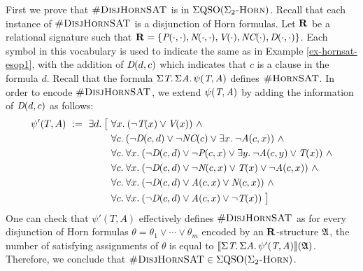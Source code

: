 First we prove that $\textsc{\#DisjHornSAT}$ is in $\Sigma{\rm QSO}(\Sigma_2\textsc{-Horn})$. Recall that each instance of $\textsc{\#DisjHornSAT}$ is a disjunction of Horn formulas. Let $\mathbf{R}$ be a relational signature such that $\mathbf{R} = \{\textit{P}(\cdot,\cdot), \textit{N}(\cdot,\cdot), \textit{V}(\cdot), \textit{NC}(\cdot), \textit{D}(\cdot,\cdot)\}$. Each symbol in this vocabulary is used to indicate the same as in Example \ref{ex-hornsat-esop1}, with the addition of $\textit{D}(d,c)$ which indicates that $c$ is a clause in the formula $d$. Recall that the formula $\Sigma{\textit{T}}.\, \Sigma{\textit{A}}.\, \psi(\textit{T},\textit{A})$
defines $\textsc{\#HornSAT}$. In order to encode $\textsc{\#DisjHornSAT}$, we extend $\psi(\textit{T},\textit{A})$ by adding the information of $\textit{D}(d,c)$ as follows:
\begin{align*}
\psi'(T,A) \ := \ \exists{d}.\: \big[ \ & \forall{x}.\: (\neg \textit{T}(x) \vee \textit{V}(x)) \ \wedge\\
& \forall{c}.\: (\neg \textit{D}(c,d)\vee \neg \textit{NC}(c) \vee  \exists{x}.\: \neg \textit{A}(c,x)) \ \wedge\\
& \forall{c}.\: \forall{x}.\: (\neg \textit{D}(c,d)\vee\neg \textit{P}(c,x) \vee \exists{y}.\: \neg \textit{A}(c,y) \vee \textit{T}(x)) \ \wedge\\
& \forall{c}.\: \forall{x}.\: (\neg \textit{D}(c,d)\vee\neg \textit{N}(c,x) \vee \textit{T}(x) \vee \neg \textit{A}(c,x)) \ \wedge\\
& \forall{c}.\: \forall{x}.\:  (\neg \textit{D}(c,d)\vee\textit{A}(c,x) \vee \textit{N}(c,x)) \ \wedge\\
& \forall{c}.\: \forall{x}.\: (\neg \textit{D}(c,d)\vee\textit{A}(c,x) \vee \neg\textit{T}(x)) \ \big]
\end{align*}
One can check that $\psi'(T,A)$ effectively defines $\textsc{\#DisjHornSAT}$ as for every disjunction of Horn formulas $\theta = \theta_1\vee\cdots\vee\theta_m$ encoded by an $\mathbf{R}$-structure $\mathfrak{A}$, the number of satisfying assignments of $\theta$ is equal to ${\llbracket{}{\Sigma{\textit{T}}.\, \Sigma{\textit{A}}.\, \psi'(\textit{T},\textit{A})}\rrbracket}(\mathfrak{A})$.  Therefore, we conclude that $\textsc{\#DisjHornSAT} \in \Sigma{\rm QSO}(\Sigma_2\textsc{-Horn})$.

